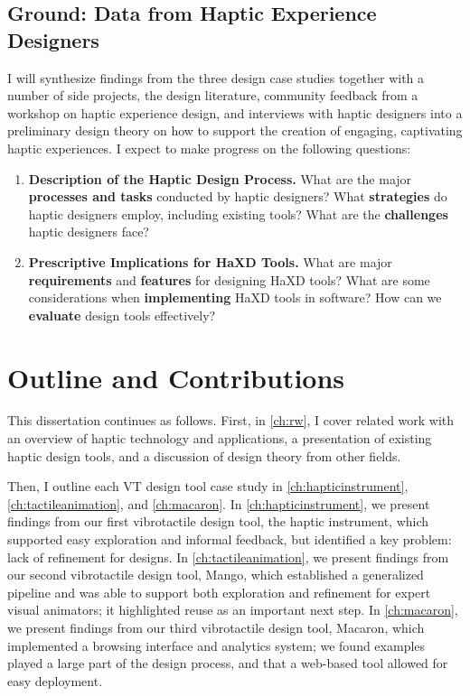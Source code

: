 \subsection{Ground: Data from Haptic Experience Designers}
I will synthesize findings from the three design case studies together with a number of side projects, the design literature, community feedback from a workshop on haptic experience design, and interviews with haptic designers into a preliminary design theory on how to support the creation of engaging, captivating haptic experiences.
I expect to make progress on the following questions:
\begin{enumerate}
    \item \textbf{Description of the Haptic Design Process.}
    What are the major \textbf{processes and tasks} conducted by haptic designers?
    What \textbf{strategies} do haptic designers employ, including existing tools?
    What are the \textbf{challenges} haptic designers face?
    
    
    \item \textbf{Prescriptive Implications for HaXD Tools.}
    What are major \textbf{requirements} and \textbf{features} for designing HaXD tools?
    What are some considerations when \textbf{implementing} HaXD tools in software?
    How can we \textbf{evaluate} design tools effectively?
\end{enumerate}


\section{Outline and Contributions}
This dissertation continues as follows.
First, in \autoref{ch:rw}, I cover related work with an overview of haptic technology and applications, a presentation of existing haptic design tools, and a discussion of design theory from other fields.

Then, I outline each VT design tool case study in \autoref{ch:hapticinstrument},  \autoref{ch:tactileanimation}, and \autoref{ch:macaron}.
In \autoref{ch:hapticinstrument}, we present findings from our first vibrotactile design tool, the haptic instrument, which supported easy exploration and informal feedback, but identified a key problem: lack of refinement for designs.
In \autoref{ch:tactileanimation}, we present findings from our second vibrotactile design tool, Mango, which established a generalized pipeline and was able to support both exploration and refinement for expert visual animators; it highlighted reuse as an important next step.
In \autoref{ch:macaron}, we present findings from our third vibrotactile design tool, Macaron, which implemented a browsing interface and analytics system; we found examples played a large part of the design process, and that a web-based tool allowed for easy deployment.

